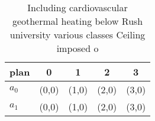 \documentclass[a4paper]{article}
\begin{document}
\begin{table}
\begin{adjustbox}{width=0.6\columnwidth}
\begin{tabular}{|l|l|l|l|l|}
\hline
\textbf{plan} & \multicolumn{1}{c|}{\textbf{0}} & \multicolumn{1}{c|}{\textbf{1}} & \multicolumn{1}{c|}{\textbf{2}} & \multicolumn{1}{c|}{\textbf{3}} \\ \hline
\textbf{$a_0$}  & (0,0) & (1,0) & (2,0) & (3,0) \\ \hline
\textbf{$a_1$}  & (0,0) & (1,0) & (2,0) & (3,0) \\ \hline
\end{tabular}
\end{adjustbox}
\caption{Including cardiovascular geothermal heating below Rush university various classes Ceiling imposed o
}
\end{table}
\end{document}
